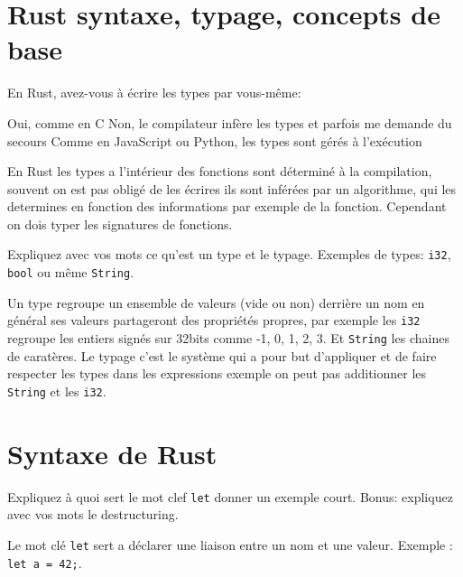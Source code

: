\documentclass[11pt,a4paper,addpoint]{exam}
\begin{document}
  \begin{questions}

    \section{Rust syntaxe, typage, concepts de base}

    \question[1] En Rust, avez-vous à écrire les types par vous-même:
    \begin{checkboxes}
        \choice Oui, comme en C
        \CorrectChoice Non, le compilateur infère les types et parfois me demande du secours
        \choice Comme en JavaScript ou Python, les types sont gérés à l'exécution
    \end{checkboxes}

    \ifprintanswers
    \begin{solution}
        En Rust les types a l'intérieur des fonctions sont déterminé à la compilation, souvent on est pas obligé de les écrires ils sont inférées par un algorithme, qui les determines en fonction des informations par exemple de la fonction. Cependant on dois typer les signatures de fonctions.
    \end{solution}
    \else
    \fi


    \question[1] Expliquez avec vos mots ce qu'est un type et le typage. Exemples de types: \texttt{i32}, \texttt{bool} ou même \texttt{String}.
    \ifprintanswers
    \begin{solution}
        Un type regroupe un ensemble de valeurs (vide ou non) derrière un nom en général ses valeurs partageront des propriétés propres,
        par exemple les \texttt{i32} regroupe les entiers signés sur 32bits comme -1, 0, 1, 2, 3. Et \texttt{String} les chaines de caratères.
        Le typage c'est le système qui a pour but d'appliquer et de faire respecter les types dans les expressions exemple on peut pas additionner les \texttt{String} et les \texttt{i32}.
    \end{solution}
    \else
    \vspace{2in}
    \fi

    \section{Syntaxe de Rust}

    \question[1] Expliquez à quoi sert le mot clef \texttt{let} donner un exemple court. Bonus: expliquez avec vos mots le destructuring.
    \ifprintanswers
    \begin{solution}
    Le mot clé  \texttt{let} sert a déclarer une liaison entre un
    nom et une valeur. Exemple : \texttt{let a = 42;}.


\end{solution}
\end{questions}
\end{document}

